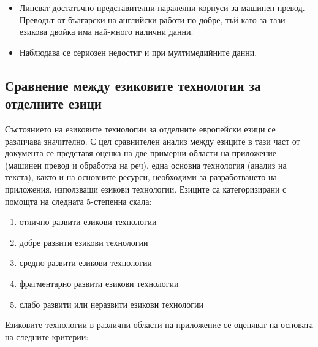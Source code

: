 \begin{multicols}{2}
\begin{itemize}
  \item Липсват достатъчно представителни паралелни корпуси за машинен
    превод. Преводът от български на английски работи по-добре, тъй като
    за тази езикова двойка има най-много налични данни.

  \item Наблюдава се сериозен недостиг и при мултимедийните данни.
  \end{itemize}

  \subsection{Сравнение между езиковите технологии за отделните езици}

  Състоянието на езиковите технологии за отделните европейски езици се различава значително. С цел сравнителен анализ между езиците в тази част от документа се представя оценка на две примерни области на приложение (машинен превод и обработка на реч), една основна технология (анализ на текста), както и на основните ресурси, необходими за разработването на приложения, използващи езикови технологии.
  Езиците са категоризирани с помощта на следната 5-степенна скала:

  \begin{enumerate}
  \item отлично развити езикови технологии
  \item добре развити езикови технологии
  \item средно развити езикови технологии
  \item фрагментарно развити езикови технологии
  \item слабо развити или неразвити езикови технологии
  \end{enumerate}

  Езиковите технологии в различни области на приложение се оценяват на
  основата на следните критерии:


\end{multicols}
